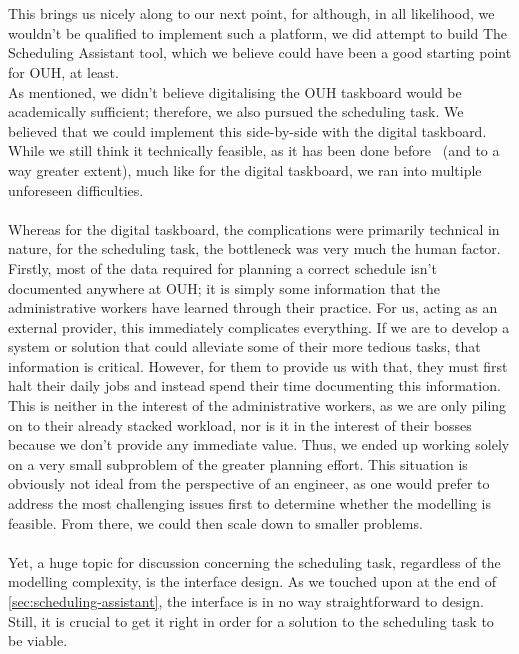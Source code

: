 \\
\\
This brings us nicely along to our next point, for although, in all likelihood, we wouldn't be qualified to implement such a platform, we did attempt to build The Scheduling Assistant tool, which we believe could have been a good starting point for OUH, at least.
\\
As mentioned, we didn't believe digitalising the OUH taskboard would be academically sufficient; therefore, we also pursued the scheduling task. We believed that we could implement this side-by-side with the digital taskboard. While we still think it technically feasible, as it has been done before~\cite{you-but-better} (and to a way greater extent), much like for the digital taskboard, we ran into multiple unforeseen difficulties.
\\
\\
Whereas for the digital taskboard, the complications were primarily technical in nature, for the scheduling task, the bottleneck was very much the human factor.
\\
Firstly, most of the data required for planning a correct schedule isn't documented anywhere at OUH; it is simply some information that the administrative workers have learned through their practice. For us, acting as an external provider, this immediately complicates everything. If we are to develop a system or solution that could alleviate some of their more tedious tasks, that information is critical. However, for them to provide us with that, they must first halt their daily jobs and instead spend their time documenting this information. This is neither in the interest of the administrative workers, as we are only piling on to their already stacked workload, nor is it in the interest of their bosses because we don't provide any immediate value. Thus, we ended up working solely on a very small subproblem of the greater planning effort. This situation is obviously not ideal from the perspective of an engineer, as one would prefer to address the most challenging issues first to determine whether the modelling is feasible. From there, we could then scale down to smaller problems.
\\
\\
Yet, a huge topic for discussion concerning the scheduling task, regardless of the modelling complexity, is the interface design. As we touched upon at the end of \autoref{sec:scheduling-assistant}, the interface is in no way straightforward to design. Still, it is crucial to get it right in order for a solution to the scheduling task to be viable. 
